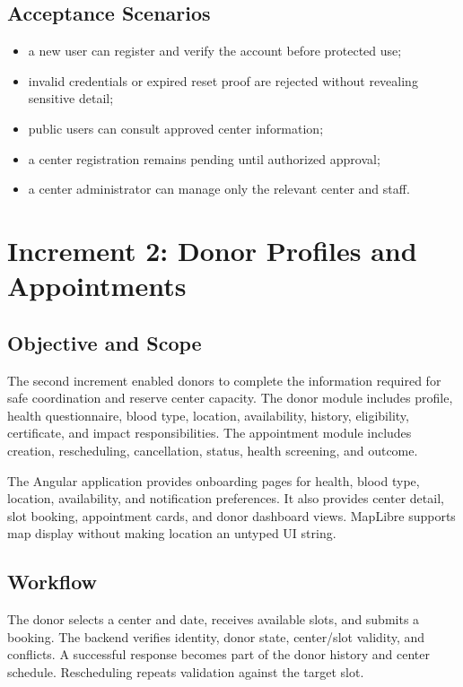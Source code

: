 \subsection{Acceptance Scenarios}
\begin{itemize}
  \item a new user can register and verify the account before protected use;
  \item invalid credentials or expired reset proof are rejected without revealing sensitive detail;
  \item public users can consult approved center information;
  \item a center registration remains pending until authorized approval;
  \item a center administrator can manage only the relevant center and staff.
\end{itemize}

\section{Increment 2: Donor Profiles and Appointments}
\subsection{Objective and Scope}
The second increment enabled donors to complete the information required for safe coordination and reserve center capacity. The donor module includes profile, health questionnaire, blood type, location, availability, history, eligibility, certificate, and impact responsibilities. The appointment module includes creation, rescheduling, cancellation, status, health screening, and outcome.

The Angular application provides onboarding pages for health, blood type, location, availability, and notification preferences. It also provides center detail, slot booking, appointment cards, and donor dashboard views. MapLibre supports map display without making location an untyped UI string.

\subsection{Workflow}
The donor selects a center and date, receives available slots, and submits a booking. The backend verifies identity, donor state, center/slot validity, and conflicts. A successful response becomes part of the donor history and center schedule. Rescheduling repeats validation against the target slot.

